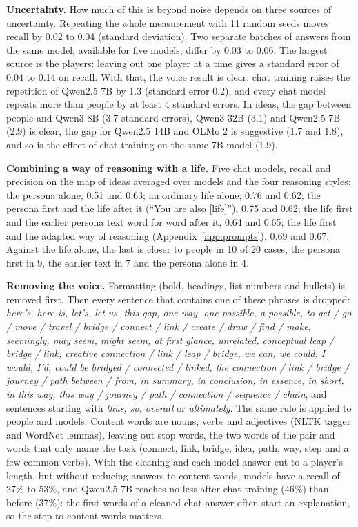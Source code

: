 \documentclass[11pt]{article}
\begin{document}


\textbf{Uncertainty.} How much of this is beyond noise depends on three sources of uncertainty. Repeating the whole measurement with 11 random seeds moves recall by 0.02 to 0.04 (standard deviation). Two separate batches of answers from the same model, available for five models, differ by 0.03 to 0.06. The largest source is the players: leaving out one player at a time gives a standard error of 0.04 to 0.14 on recall. With that, the voice result is clear: chat training raises the repetition of Qwen2.5 7B by 1.3 (standard error 0.2), and every chat model repeats more than people by at least 4 standard errors. In ideas, the gap between people and Qwen3 8B (3.7 standard errors), Qwen3 32B (3.1) and Qwen2.5 7B (2.9) is clear, the gap for Qwen2.5 14B and OLMo 2 is suggestive (1.7 and 1.8), and so is the effect of chat training on the same 7B model (1.9).



\textbf{Combining a way of reasoning with a life.} Five chat models, recall and precision on the map of ideas averaged over models and the four reasoning styles: the persona alone, 0.51 and 0.63; an ordinary life alone, 0.76 and 0.62; the persona first and the life after it (``You are also [life]''), 0.75 and 0.62; the life first and the earlier persona text word for word after it, 0.64 and 0.65; the life first and the adapted way of reasoning (Appendix~\ref{app:prompts}), 0.69 and 0.67. Against the life alone, the last is closer to people in 10 of 20 cases, the persona first in 9, the earlier text in 7 and the persona alone in 4.

\textbf{Removing the voice.} Formatting (bold, headings, list numbers and bullets) is removed first. Then every sentence that contains one of these phrases is dropped: \emph{here's, here is, let's, let us, this gap, one way, one possible, a possible, to get / go / move / travel / bridge / connect / link / create / draw / find / make, seemingly, may seem, might seem, at first glance, unrelated, conceptual leap / bridge / link, creative connection / link / leap / bridge, we can, we could, I would, I'd, could be bridged / connected / linked, the connection / link / bridge / journey / path between / from, in summary, in conclusion, in essence, in short, in this way, this way / journey / path / connection / sequence / chain}, and sentences starting with \emph{thus, so, overall} or \emph{ultimately}. The same rule is applied to people and models. Content words are nouns, verbs and adjectives (NLTK tagger and WordNet lemmas), leaving out stop words, the two words of the pair and words that only name the task (connect, link, bridge, idea, path, way, step and a few common verbs). With the cleaning and each model answer cut to a player's length, but without reducing answers to content words, models have a recall of 27\% to 53\%, and Qwen2.5 7B reaches no less after chat training (46\%) than before (37\%): the first words of a cleaned chat answer often start an explanation, so the step to content words matters.
\end{document}
